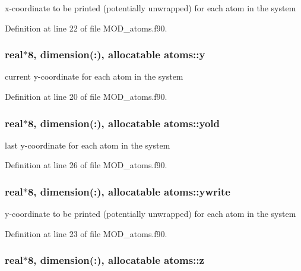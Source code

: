 x-\/coordinate to be printed (potentially unwrapped) for each atom in the system 



Definition at line 22 of file M\-O\-D\-\_\-atoms.\-f90.

\hypertarget{classatoms_acb7a284510ae51efb81ef1e3307a8323}{
\subsubsection[{y}]{\setlength{\rightskip}{0pt plus 5cm}real$\ast$8, dimension(\-:), allocatable atoms\-::y}}\label{classatoms_acb7a284510ae51efb81ef1e3307a8323}


current y-\/coordinate for each atom in the system 



Definition at line 20 of file M\-O\-D\-\_\-atoms.\-f90.

\hypertarget{classatoms_af308f9cc36eba4e61c6e0a24d53a65fc}{
\subsubsection[{yold}]{\setlength{\rightskip}{0pt plus 5cm}real$\ast$8, dimension(\-:), allocatable atoms\-::yold}}\label{classatoms_af308f9cc36eba4e61c6e0a24d53a65fc}


last y-\/coordinate for each atom in the system 



Definition at line 26 of file M\-O\-D\-\_\-atoms.\-f90.

\hypertarget{classatoms_aa14fc2e014bdadb63756ec374906e009}{
\subsubsection[{ywrite}]{\setlength{\rightskip}{0pt plus 5cm}real$\ast$8, dimension(\-:), allocatable atoms\-::ywrite}}\label{classatoms_aa14fc2e014bdadb63756ec374906e009}


y-\/coordinate to be printed (potentially unwrapped) for each atom in the system 



Definition at line 23 of file M\-O\-D\-\_\-atoms.\-f90.

\hypertarget{classatoms_ad56d525716f84f1dd47a450c903adab7}{
\subsubsection[{z}]{\setlength{\rightskip}{0pt plus 5cm}real$\ast$8, dimension(\-:), allocatable atoms\-::z}}\label{classatoms_ad56d525716f84f1dd47a450c903adab7}


